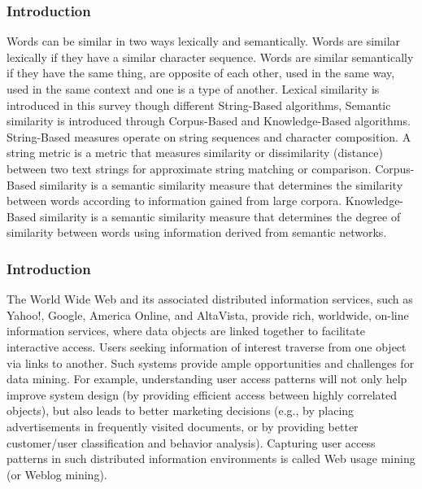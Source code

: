 \documentclass{beamer}
\begin{document}
\begin{frame}
    \frametitle{Introduction}
    \begin{minipage}{\textwidth} 
        Words can be similar in two ways lexically and semantically. Words are similar lexically if they
        have a similar character sequence. Words are similar
        semantically if they have the same thing, are opposite of each
        other, used in the same way, used in the same context and one
        is a type of another. Lexical similarity is introduced in this
        survey though different String-Based algorithms, Semantic
        similarity is introduced through Corpus-Based and
        Knowledge-Based algorithms. String-Based measures operate
        on string sequences and character composition. A string
        metric is a metric that measures similarity or dissimilarity
        (distance) between two text strings for approximate string
        matching or comparison. Corpus-Based similarity is a
        semantic similarity measure that determines the similarity
        between words according to information gained from large
        corpora. Knowledge-Based similarity is a semantic similarity
        measure that determines the degree of similarity between
        words using information derived from semantic networks. 
    \end{minipage}
\end{frame}    

\begin{frame}
    \frametitle{Introduction}
    \begin{minipage}{\textwidth}
        The World Wide Web and its associated distributed information services, such as
        Yahoo!, Google, America Online, and AltaVista, provide rich, worldwide, on-line information
        services, where data objects are linked together to facilitate interactive access.
        Users seeking information of interest traverse from one object via links to another.
        Such systems provide ample opportunities and challenges for data mining. For example,
        understanding user access patterns will not only help improve system design (by
        providing efficient access between highly correlated objects), but also leads to better
        marketing decisions (e.g., by placing advertisements in frequently visited documents,
        or by providing better customer/user classification and behavior analysis). Capturing
        user access patterns in such distributed information environments is called Web usage
        mining (or Weblog mining).
    \end{minipage}
\end{frame}
\end{document}

